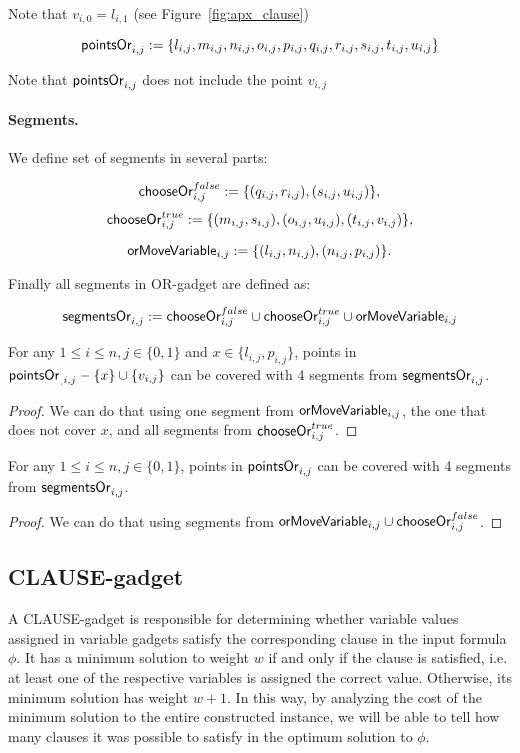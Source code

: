 Note that $v_{i, 0} = l_{i, 1}$ (see Figure~\ref{fig:apx_clause})
 
$$\mathsf{pointsOr}_{i,j} := 
 \{l_{i, j}, m_{i, j}, n_{i, j}, o_{i, j},
 p_{i, j}, q_{i, j}, r_{i, j}, s_{i, j}, t_{i, j}, u_{i, j} \}
 $$
 
Note that $\mathsf{pointsOr}_{i,j}$ does not include the point $v_{i,j}$
 
\paragraph{Segments.}

We define set of segments in several parts:
 
$$\mathsf{chooseOr}^{false}_{i,j} :=
\{ (q_{i, j}, r_{i, j}), (s_{i, j}, u_{i, j})\},$$
$$\mathsf{chooseOr}^{true}_{i,j} :=
\{ (m_{i, j}, s_{i, j}), (o_{i, j}, u_{i, j}),
(t_{i, j}, v_{i, j}) \},$$

$$\mathsf{orMoveVariable}_{i,j} :=
\{ (l_{i, j}, n_{i, j}), (n_{i, j}, p_{i, j})\}.$$

Finally all segments in OR-gadget are defined as:

$$\mathsf{segmentsOr}_{i,j} := 
  \mathsf{chooseOr}^{false}_{i,j} \cup \mathsf{chooseOr}^{true}_{i,j} \cup \mathsf{orMoveVariable}_{i,j}
$$


\begin{lemma}
\label{cover_or_true}
For any $1 \le i \le n, j \in \{0, 1\}$ and 
 $x \in \{l_{i, j}, p_{i, j}\}$, points in
$\mathsf{pointsOr}_{_,i, j} - \{ x\} \cup \{v_{i, j}\}$
can be covered
with 4 segments from $\mathsf{segmentsOr}_{i,j}$.
\end{lemma}

\begin{proof}
We can do that using one segment from
$\mathsf{orMoveVariable}_{i,j}$, the one that does not cover $x$,
and all segments from $\mathsf{chooseOr}^{true}_{i,j}$.
\end{proof}

\begin{lemma}
\label{cover_or_false}
For any $1 \le i \le n, j \in \{0, 1\}$, points in
$\mathsf{pointsOr}_{i,j}$ can be covered
with 4 segments from $\mathsf{segmentsOr}_{i,j}$.
\end{lemma}

\begin{proof}
We can do that using segments from $\mathsf{orMoveVariable}_{i,j} \cup \mathsf{chooseOr}^{false}_{i,j}$.
\end{proof}


\subsection{CLAUSE-gadget}
A CLAUSE-gadget is responsible for determining whether
variable values assigned in variable gadgets
satisfy the corresponding clause in the input formula $\phi$.
It has a minimum solution to weight $w$
if and only if the clause is satisfied, i.e. at least one
of the respective variables is assigned the correct value.
Otherwise, its minimum solution has weight $w+1$.
In this way, by analyzing the cost of the minimum
solution to the entire constructed instance, we will be able to tell
how many clauses it was possible to satisfy
in the optimum solution to $\phi$.


